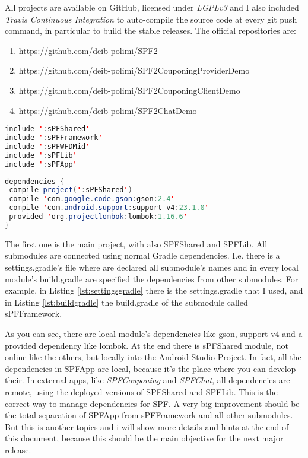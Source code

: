 All projects are available on GitHub, licensed under \emph{LGPLv3} and I also included \emph{Travis Continuous Integration} to auto-compile the source code at every \textsf{git push} command, in particular to build the stable releases.
The official repositories are:
\begin{enumerate}
	\item https://github.com/deib-polimi/SPF2
	\item https://github.com/deib-polimi/SPF2CouponingProviderDemo
	\item https://github.com/deib-polimi/SPF2CouponingClientDemo
	\item https://github.com/deib-polimi/SPF2ChatDemo
\end{enumerate}

\begin{lstlisting}[caption={settings.gradle},label=lst:settingsgradle, language=Java]
include ':sPFShared'
include ':sPFFramework'
include ':sPFWFDMid'
include ':sPFLib'
include ':sPFApp'
\end{lstlisting}

\begin{lstlisting}[caption={build.gradle},label=lst:buildgradle, language=Java]
dependencies {
 compile project(':sPFShared')
 compile 'com.google.code.gson:gson:2.4'
 compile 'com.android.support:support-v4:23.1.0'
 provided 'org.projectlombok:lombok:1.16.6'
}
\end{lstlisting}

The first one is the main project, with also \textsf{SPFShared} and \textsf{SPFLib}. All submodules are connected using normal Gradle dependencies.
I.e. there is a \textsf{settings.gradle}'s file where are declared all submodule's names and in every local module's \textsf{build.gradle} are specified the dependencies from other submodules. For example, in Listing \ref{lst:settingsgradle} there is the \textsf{settings.gradle} that I used, and in Listing \ref{lst:buildgradle} the \textsf{build.gradle} of the submodule called \textsf{sPFFramework}.

As you can see, there are local module's dependencies like \textsf{gson}, \textsf{support-v4} and a provided dependency like \textsf{lombok}. At the end there is \textsf{sPFShared} module, not online like the others, but locally into the Android Studio Project. In fact, all the dependencies in \textsf{SPFApp} are local, because it's the place where you can develop their. In external apps, like \emph{SPFCouponing} and \emph{SPFChat}, all dependencies are remote, using the deployed versions of \textsf{SPFShared} and \textsf{SPFLib}. This is the correct way to manage dependencies for SPF.
A very big improvement should be the total separation of \textsf{SPFApp} from \textsf{sPFFramework} and all other submodules. But this is another topics and i will show more details and hints at the end of this document, because this should be the main objective for the next major release.

